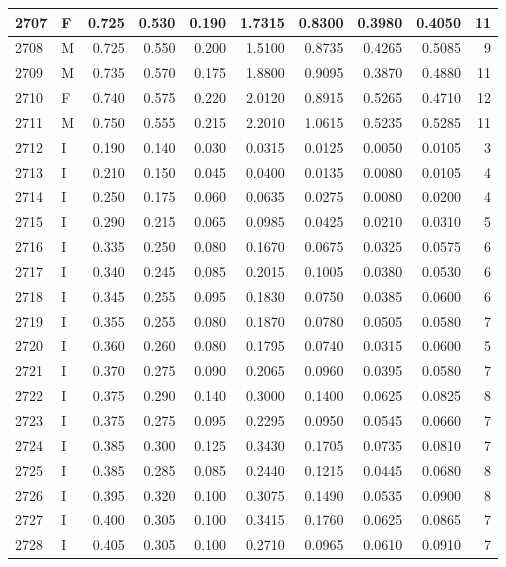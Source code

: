 \documentclass[9pt,twocolumn,twoside,]{pnas-new}
\begin{document}
\begin{tabular}{l|l|r|r|r|r|r|r|r|r}
\hline
2707 & F & 0.725 & 0.530 & 0.190 & 1.7315 & 0.8300 & 0.3980 & 0.4050 & 11\\
\hline
2708 & M & 0.725 & 0.550 & 0.200 & 1.5100 & 0.8735 & 0.4265 & 0.5085 & 9\\
\hline
2709 & M & 0.735 & 0.570 & 0.175 & 1.8800 & 0.9095 & 0.3870 & 0.4880 & 11\\
\hline
2710 & F & 0.740 & 0.575 & 0.220 & 2.0120 & 0.8915 & 0.5265 & 0.4710 & 12\\
\hline
2711 & M & 0.750 & 0.555 & 0.215 & 2.2010 & 1.0615 & 0.5235 & 0.5285 & 11\\
\hline
2712 & I & 0.190 & 0.140 & 0.030 & 0.0315 & 0.0125 & 0.0050 & 0.0105 & 3\\
\hline
2713 & I & 0.210 & 0.150 & 0.045 & 0.0400 & 0.0135 & 0.0080 & 0.0105 & 4\\
\hline
2714 & I & 0.250 & 0.175 & 0.060 & 0.0635 & 0.0275 & 0.0080 & 0.0200 & 4\\
\hline
2715 & I & 0.290 & 0.215 & 0.065 & 0.0985 & 0.0425 & 0.0210 & 0.0310 & 5\\
\hline
2716 & I & 0.335 & 0.250 & 0.080 & 0.1670 & 0.0675 & 0.0325 & 0.0575 & 6\\
\hline
2717 & I & 0.340 & 0.245 & 0.085 & 0.2015 & 0.1005 & 0.0380 & 0.0530 & 6\\
\hline
2718 & I & 0.345 & 0.255 & 0.095 & 0.1830 & 0.0750 & 0.0385 & 0.0600 & 6\\
\hline
2719 & I & 0.355 & 0.255 & 0.080 & 0.1870 & 0.0780 & 0.0505 & 0.0580 & 7\\
\hline
2720 & I & 0.360 & 0.260 & 0.080 & 0.1795 & 0.0740 & 0.0315 & 0.0600 & 5\\
\hline
2721 & I & 0.370 & 0.275 & 0.090 & 0.2065 & 0.0960 & 0.0395 & 0.0580 & 7\\
\hline
2722 & I & 0.375 & 0.290 & 0.140 & 0.3000 & 0.1400 & 0.0625 & 0.0825 & 8\\
\hline
2723 & I & 0.375 & 0.275 & 0.095 & 0.2295 & 0.0950 & 0.0545 & 0.0660 & 7\\
\hline
2724 & I & 0.385 & 0.300 & 0.125 & 0.3430 & 0.1705 & 0.0735 & 0.0810 & 7\\
\hline
2725 & I & 0.385 & 0.285 & 0.085 & 0.2440 & 0.1215 & 0.0445 & 0.0680 & 8\\
\hline
2726 & I & 0.395 & 0.320 & 0.100 & 0.3075 & 0.1490 & 0.0535 & 0.0900 & 8\\
\hline
2727 & I & 0.400 & 0.305 & 0.100 & 0.3415 & 0.1760 & 0.0625 & 0.0865 & 7\\
\hline
2728 & I & 0.405 & 0.305 & 0.100 & 0.2710 & 0.0965 & 0.0610 & 0.0910 & 7\\

\end{tabular}
\end{document}
